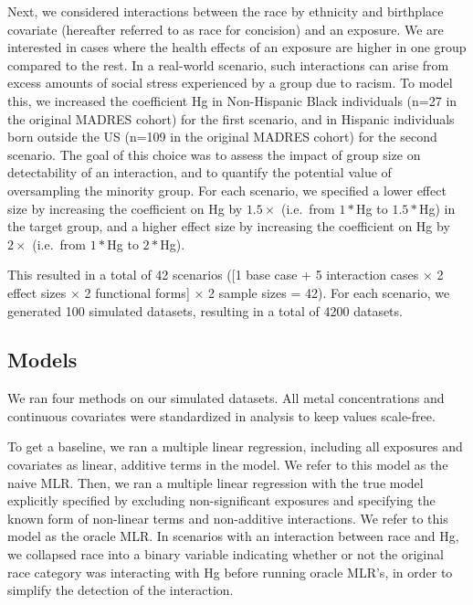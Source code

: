 \documentclass[12pt, twoside]{amherstthesis}
\begin{document}
Next, we considered interactions between the race by ethnicity and birthplace covariate (hereafter referred to as race for concision) and an exposure. We are interested in cases where the health effects of an exposure are higher in one group compared to the rest. In a real-world scenario, such interactions can arise from excess amounts of social stress experienced by a group due to racism. To model this, we increased the coefficient Hg in Non-Hispanic Black individuals (n=27 in the original MADRES cohort) for the first scenario, and in Hispanic individuals born outside the US (n=109 in the original MADRES cohort) for the second scenario. The goal of this choice was to assess the impact of group size on detectability of an interaction, and to quantify the potential value of oversampling the minority group. For each scenario, we specified a lower effect size by increasing the coefficient on Hg by \(1.5\times\) (i.e.~from \(1*\)Hg to \(1.5*\)Hg) in the target group, and a higher effect size by increasing the coefficient on Hg by \(2\times\) (i.e.~from \(1*\)Hg to \(2*\)Hg).

This resulted in a total of 42 scenarios ({[}1 base case + 5 interaction cases \(\times\) 2 effect sizes \(\times\) 2 functional forms{]} \(\times\) 2 sample sizes = 42). For each scenario, we generated 100 simulated datasets, resulting in a total of 4200 datasets.

\hypertarget{models}{%
\subsection{Models}\label{models}}

We ran four methods on our simulated datasets. All metal concentrations and continuous covariates were standardized in analysis to keep values scale-free.

To get a baseline, we ran a multiple linear regression, including all exposures and covariates as linear, additive terms in the model. We refer to this model as the naive MLR. Then, we ran a multiple linear regression with the true model explicitly specified by excluding non-significant exposures and specifying the known form of non-linear terms and non-additive interactions. We refer to this model as the oracle MLR. In scenarios with an interaction between race and Hg, we collapsed race into a binary variable indicating whether or not the original race category was interacting with Hg before running oracle MLR's, in order to simplify the detection of the interaction.
\end{document}
